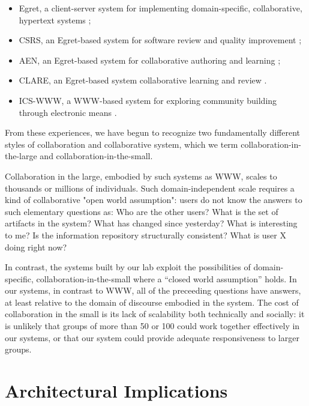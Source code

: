\begin{itemize}
\item Egret, a client-server system for implementing domain-specific,
  collaborative, hypertext systems
  \cite{egret-home-page,csdl-91-03,csdl-92-01,csdl-93-09};

\item CSRS, an Egret-based system for software review and quality
  improvement
  \cite{csrs-home-page,csdl-94-03,csdl-94-08,csdl-93-07,csdl-93-22,csdl-91-03,csdl-92-01,csdl-93-09};

\item AEN, an Egret-based system for 
     collaborative authoring and learning \cite{aen-home-page};
\item CLARE,  an Egret-based system
     collaborative learning and review \cite{clare-home-page,csdl-93-14,csdl-93-21,csdl-94-04}.
\item ICS-WWW, a WWW-based system
     for exploring community building through electronic means \cite{ics-www-home-page}.
\end{itemize}

From these experiences, we have begun to recognize two fundamentally different
styles of collaboration and collaborative system, which we term 
collaboration-in-the-large and collaboration-in-the-small.  

Collaboration in the large, embodied by such systems as WWW, scales to
thousands or millions of individuals.  Such domain-independent scale
requires a kind of collaborative "open world assumption": users do not know
the answers to such elementary questions as: Who are the other users?  What
is the set of artifacts in the system?  What has changed since yesterday?
What is interesting to me? Is the information repository structurally
consistent? What is user X doing right now?   

In contrast, the systems built by our lab exploit the possibilities of
domain-specific, collaboration-in-the-small where a ``closed world
assumption'' holds.  In our systems, in contrast to WWW, all of the
preceeding questions have answers, at least relative to the domain of
discourse embodied in the system.  The cost of collaboration in the small
is its lack of scalability both technically and socially: it is unlikely
that groups of more than 50 or 100 could work together effectively in our
systems, or that our system could provide adequate responsiveness to larger
groups.

\section{Architectural Implications}

